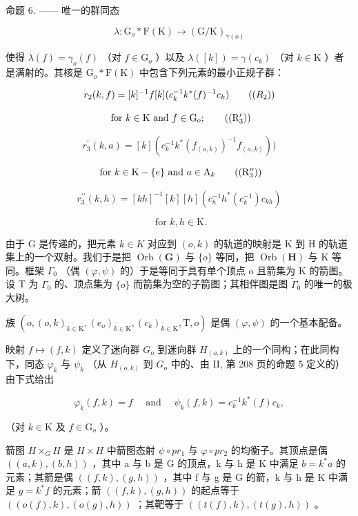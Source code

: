 命题 6. —— 唯一的群同态

\[
\lambda \colon \mathrm{G} _ {o} * \mathrm{F} (\mathrm{K}) \to (\mathrm{G} / \mathrm{K}) _ {\gamma (o)}
\]

使得 \(\lambda(f) = \gamma_o(f)\) （对 \(f \in \mathrm{G}_o\) ）以及 \(\lambda([k]) = \gamma(c_k)\) （对 \(k \in \mathrm{K}\) ）者是满射的。其核是 \(\mathrm{G}_o * \mathrm{F}(\mathrm{K})\) 中包含下列元素的最小正规子群：

\[
r _ {2} (k, f) = [ k ] ^ {- 1} f [ k ] (c _ {k} ^ {- 1} k ^ {*} (f) ^ {- 1} c _ {k})\tag{\((R_{2})\)}
\]

\[
\text { for } k \in \mathrm{K} \text { and } f \in \mathrm{G} _ {o};\tag{\((\mathrm{R}_{3}^{\prime})\)}
\]

\[
r _ {3} ^ {\prime} (k, a) = [ k ] (c _ {k} ^ {- 1} k ^ {*} (f _ {(a, k)}) ^ {- 1} f _ {(a, k)}))
\]

\[
\text { for } k \in \mathrm{K} - \{e \} \text { and } a \in \mathrm{A} _{k}\tag{\((\mathrm{R}_{3}^{\prime\prime})\)}
\]

\[
r _ {3} ^ {\prime \prime} (k, h) = [ k h ] ^ {- 1} [ k ] [ h ] (c _ {h} ^ {- 1} h ^ {*} (c _ {k} ^ {- 1}) c _ {k h})
\]

\[
\text { for } k,h \in \mathrm{K}.
\]

由于 G 是传递的，把元素 \(k \in K\) 对应到 \((o, k)\) 的轨道的映射是 K 到 H 的轨道集上的一个双射。我们于是把 \(\operatorname{Orb}(\mathbf{G})\) 与 \(\{o\}\) 等同，把 \(\operatorname{Orb}(\mathbf{H})\) 与 K 等同。框架 \(\Gamma_{0}\) （偶 \((\varphi, \psi)\) 的）于是等同于具有单个顶点 o 且箭集为 K 的箭图。设 T 为 \(\Gamma_{0}\) 的、顶点集为 \(\{o\}\) 而箭集为空的子箭图；其相伴图是图 \(\widetilde{\Gamma}_{0}\) 的唯一的极大树。

族 \((o,(o,k)_{k\in \mathrm{K}},(e_o)_{k\in \mathrm{K}},(c_k)_{k\in \mathrm{K}},\mathrm{T},o)\) 是偶 \((\varphi ,\psi)\) 的一个基本配备。

映射 \(f \mapsto (f, k)\) 定义了迷向群 \(G_o\) 到迷向群 \(H_{(o,k)}\) 上的一个同构；在此同构下，同态 \(\varphi_k\) 与 \(\psi_k\) （从 \(H_{(o,k)}\) 到 \(G_o\) 中的、由 II, 第 208 页的命题 5 定义的）由下式给出

\[
\varphi_ {k} (f, k) = f \quad \text { and } \quad \psi_ {k} (f, k) = c _ {k} ^ {- 1} k ^ {*} (f) c _ {k},\tag{3}
\]

（对 \(k\in \mathrm{K}\) 及 \(f\in \mathrm{G}_o\) ）。

箭图 \(H \times_{G} H\) 是 \(H \times H\) 中箭图态射 \(\psi \circ pr_{1}\) 与 \(\varphi \circ pr_{2}\) 的均衡子。其顶点是偶 \(((a, k), (b, h))\) ，其中 a 与 b 是 G 的顶点，k 与 h 是 K 中满足 \(b = k^{*}a\) 的元素；其箭是偶 \(((f, k), (g, h))\) ，其中 f 与 g 是 G 的箭，k 与 h 是 K 中满足 \(g = k^{*}f\) 的元素；箭 \(((f,k),(g,h))\) 的起点等于 \(((o(f),k),(o(g),h))\) ；其靶等于 \(((t(f),k),(t(g),h))\) 。


